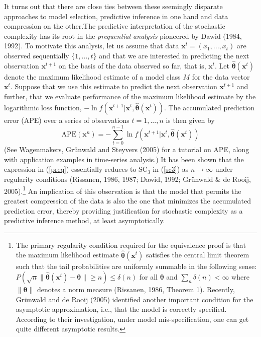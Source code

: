 \documentclass{elsart}
\begin{document}
It turns out that there are close ties between these seemingly disparate approaches to model
selection, predictive inference in one hand and data compression on the other.The predictive
interpretation of the stochastic complexity has its root in the {\it prequential
analysis} pioneered by Dawid (1984, 1992). To motivate this analysis, let us assume that data $\bm
x^t = (x_1,..., x_t)$ are observed sequentially $\{ 1,...,t \}$ and that we are
interested in predicting the next observation $\bm x^{t+1}$ on the basis of the data observed so
far, that is, $\bm x^t$. Let $\hat {\bm \theta} (\bm x^t)$ denote the maximum likelihood estimate
of a model class $M$ for the data vector $\bm x^t$. Suppose that we use this estimate to predict
the next observation $\bm x^{t+1}$ and further, that we evaluate performance of the maximum
likelihood estimate by the logarithmic loss function, $-\ln f(\bm x^{t+1}|\bm x^t, \hat {\bm
\theta} (\bm x^t))$. The accumulated prediction error (APE) over a series of observations $ t = 1,...,n$
is then given by
\begin{equation}\label{preq}
\mbox{APE}(\bm x^n) = -\sum_{t=0}^{n-1} \ln f(\bm x^{t+1}|\bm x^t, \hat {\bm \theta} (\bm x^t))
\end{equation}
(See Wagenmakers, Gr\"{u}nwald and Steyvers (2005) for a tutorial on APE, along with application
examples in time-series analysis.) It has been shown that the expression in (\ref{preq})
essentially reduces to $\mbox{SC}_3$ in (\ref{sc3}) as $n \rightarrow \infty$ under regularity
conditions (Rissanen, 1986, 1987; Dawid, 1992; Gr\"{u}nwald \& de Rooij, 2005).\footnote{The
primary regularity condition required for the equivalence proof is that the maximum likelihood
estimate $\hat {\bm \theta} (\bm x^t)$ satisfies the central limit theorem such that the tail
probabilities are uniformly summable in the following sense: $P \left(\sqrt{n}
\parallel \hat {\bm \theta} (\bm x^t) -\bm \theta \parallel \geq n \right) \leq \delta(n)$ for all
$\bm \theta$ and $\sum_n \delta(n) < \infty$ where $\parallel \bm \theta \parallel$ denotes a norm
measure (Rissanen, 1986, Theorem 1). Recently, Gr\"{u}nwald and de Rooij (2005) identified another
important condition for the asymptotic approximation, i.e., that the model is correctly specified.
According to their investigation, under model mis-specification, one can get quite different
asymptotic results.} An implication of this observation is that the model that permits the
greatest compression of the data is also the one that minimizes the accumulated prediction error,
thereby providing justification for stochastic complexity as a predictive inference method, at
least asymptotically.
\end{document}
